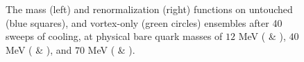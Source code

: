 \documentclass[
 reprint,
 amsmath,amssymb,
 aps,
prd,
]{revtex4-1}
\begin{document}
\begin{figure}[thpb]
\caption{The mass (left) and renormalization (right) functions on untouched (blue squares), and vortex-only (green circles) ensembles after 40 sweeps of cooling, at physical bare quark masses of $12$ MeV ( \& ), $40$ MeV ( \& ), and $70$ MeV ( \& ).} 
\label{Fig:MUTc40VOc40}
\end{figure}
\begin{figure}[thpb]

\end{figure}
\end{document}
